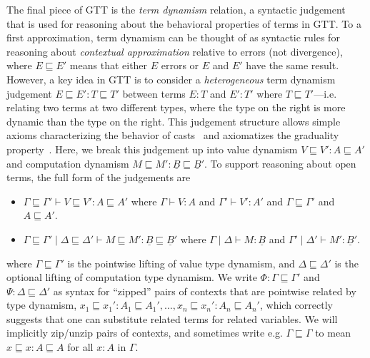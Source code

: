 \documentclass[acmsmall,nonacm]{acmart}
\renewcommand{\u}{\underline}
\newcommand{\ltdyn}{\sqsubseteq}
\begin{document}
The final piece of GTT is the \emph{term dynamism} relation, a syntactic
judgement that is used for reasoning about the behavioral properties of
terms in GTT.  To a first approximation, term dynamism can be thought of
as syntactic rules for reasoning about \emph{contextual approximation}
relative to errors (not divergence), where $E \ltdyn E'$ means that
either $E$ errors or $E$ and $E'$ have the same result.  However, a key
idea in GTT is to consider a \emph{heterogeneous} term dynamism
judgement $E \ltdyn E' : T \ltdyn T'$ between terms $E : T$ and $E' :
T'$ where $T \ltdyn T'$---i.e. relating two terms at two different
types, where the type on the right is more dynamic than the type on the
right.  This judgement structure allows simple axioms characterizing the
%
behavior of casts~\cite{newlicata2018-fscd} and axiomatizes the
graduality property~\cite{refined}.
%
Here, we break this judgement up into
%
value dynamism $V \ltdyn V' : A \ltdyn A'$ and computation dynamism $M
\ltdyn M' : \u B \ltdyn \u B'$.  To support reasoning about open terms,
the full form of the judgements are
\begin{itemize}
\item $\Gamma \ltdyn \Gamma' \vdash V \ltdyn V' : A \ltdyn A'$ where
  $\Gamma \vdash V : A$ and $\Gamma' \vdash V' : A'$ and $\Gamma \ltdyn
  \Gamma'$ and $A \ltdyn A'$.
\item 
$\Gamma \ltdyn \Gamma' \mid \Delta \ltdyn \Delta' \vdash M \ltdyn M' :
  \u B \ltdyn \u B'$ where $\Gamma \mid \Delta \vdash M : \u B$ and
  $\Gamma' \mid \Delta' \vdash M' : \u B'$.
\end{itemize}
where $\Gamma \ltdyn \Gamma'$ is the pointwise lifting of value type
dynamism, and $\Delta \ltdyn \Delta'$ is the optional lifting of
computation type dynamism.  We write $\Phi : \Gamma \ltdyn \Gamma'$ and
$\Psi : \Delta \ltdyn \Delta'$ as syntax for ``zipped'' pairs of
contexts that are pointwise related by type dynamism, $x_1 \ltdyn x_1' : A_1 \ltdyn A_1', \ldots, x_n \ltdyn x_n' :
A_n \ltdyn A_n'$, which correctly suggests that one can substitute related
terms for related variables.  We will implicitly zip/unzip pairs of
contexts, and sometimes write e.g. $\Gamma \ltdyn \Gamma$ to mean $x
\ltdyn x : A \ltdyn A$ for all $x : A$ in $\Gamma$.
\end{document}

